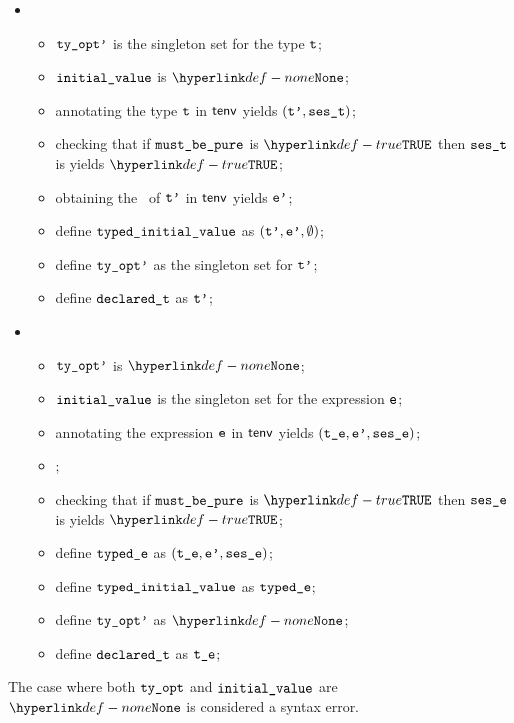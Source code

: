 \begin{itemize}
  \item {}
  \begin{itemize}
    \item $\texttt{ty\_opt'}$ is the singleton set for the type $\texttt{t}$;
    \item $\texttt{initial\_value}$ is $\None$;
    \item annotating the type $\texttt{t}$ in $\textsf{tenv}$ yields $(\texttt{t'}, \texttt{ses\_t})$\ProseOrTypeError;
    \item checking that if $\texttt{must\_be\_pure}$ is $\True$ then $\texttt{ses\_t}$ is \pure{} yields $\True$\ProseOrTypeError;
    \item obtaining the \basevalueterm\ of $\texttt{t'}$ in $\textsf{tenv}$ yields $\texttt{e'}$\ProseOrTypeError;
    \item define $\texttt{typed\_initial\_value}$ as $(\texttt{t'}, \texttt{e'}, \emptyset)$;
    \item define $\texttt{ty\_opt'}$ as the singleton set for $\texttt{t'}$;
    \item define $\texttt{declared\_t}$ as $\texttt{t'}$;
  \end{itemize}

  \item {}
  \begin{itemize}
    \item $\texttt{ty\_opt'}$ is $\None$;
    \item $\texttt{initial\_value}$ is the singleton set for the expression $\texttt{e}$;
    \item annotating the expression $\texttt{e}$ in $\textsf{tenv}$ yields $(\texttt{t\_e}, \texttt{e'}, \texttt{ses\_e})$\ProseOrTypeError;
    \item \Prosenoprecisionloss{$\vte$};
    \item checking that if $\texttt{must\_be\_pure}$ is $\True$ then $\texttt{ses\_e}$ is \pure{} yields $\True$\ProseOrTypeError;
    \item define $\texttt{typed\_e}$ as $(\texttt{t\_e}, \texttt{e'}, \texttt{ses\_e})$;
    \item define $\texttt{typed\_initial\_value}$ as $\texttt{typed\_e}$;
    \item define $\texttt{ty\_opt'}$ as $\None$;
    \item define $\texttt{declared\_t}$ as $\vte$;
  \end{itemize}
\end{itemize}
The case where both $\texttt{ty\_opt}$ and $\texttt{initial\_value}$ are $\None$ is considered a syntax error.

